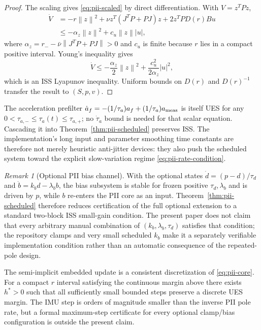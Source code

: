 \documentclass[conference]{IEEEtran}
\newcommand{\norm}[1]{\left\lVert#1\right\rVert}
\newcommand{\abs}[1]{\left|#1\right|}
\theoremstyle{remark}
\newtheorem{remark}{Remark}
\begin{document}
\begin{proof}
The scaling gives \eqref{eq:pii-scaled} by direct differentiation.  With
$V=z^TPz$,
\begin{align}
 \dot V
 &=-r\norm z^2
 +\nu z^T(J^TP+PJ)z
 +2z^TPD(r)Bu\\
 &\le-\alpha_z\norm z^2+c_u\norm z\abs u,
 \label{eq:pii-Vdot}
\end{align}
where
$\alpha_z=r_--\bar\nu\norm{J^TP+PJ}>0$ and $c_u$ is finite because $r$ lies in
a compact positive interval.  Young's inequality gives
\begin{equation}
 \dot V\le-\frac{\alpha_z}{2}\norm z^2
 +\frac{c_u^2}{2\alpha_z}\abs u^2,
\end{equation}
which is an ISS Lyapunov inequality.  Uniform bounds on $D(r)$ and $D(r)^{-1}$
transfer the result to $(S,p,v)$.
\end{proof}

The acceleration prefilter
$\dot a_f=-(1/\tau_a)a_f+(1/\tau_a)a_{\rm meas}$ is itself UES for any
$0<\tau_{a,-}\le\tau_a(t)\le\tau_{a,+}$; no $\dot\tau_a$ bound is needed for
that scalar equation.  Cascading it into Theorem~\ref{thm:pii-scheduled}
preserves ISS.  The implementation's long input and parameter smoothing time
constants are therefore not merely heuristic anti-jitter devices: they also
push the scheduled system toward the explicit slow-variation regime
\eqref{eq:pii-rate-condition}.

\begin{remark}[Optional PII bias channel]
With the optional states
$\dot d=(p-d)/\tau_d$ and $\dot b=k_b d-\lambda_b b$, the bias subsystem is
stable for frozen positive $\tau_d,\lambda_b$ and is driven by $p$, while $b$
re-enters the PII core as an input.  Theorem~\ref{thm:pii-scheduled} therefore
reduces certification of the full optional extension to a standard two-block
ISS small-gain condition.  The present paper does not claim that every arbitrary
manual combination of $(k_b,\lambda_b,\tau_d)$ satisfies that condition; the
repository clamps and very small scheduled $k_b$ make it a separately
verifiable implementation condition rather than an automatic consequence of
the repeated-pole design.
\end{remark}

The semi-implicit embedded update is a consistent discretization of
\eqref{eq:pii-core}.  For a compact $r$ interval satisfying the continuous
margin above there exists $h^*>0$ such that all sufficiently small bounded
steps preserve a discrete UES margin.  The IMU step is orders of
magnitude smaller than the inverse PII pole rate, but a formal maximum-step
certificate for every optional clamp/bias configuration is outside the present
claim.
\end{document}
